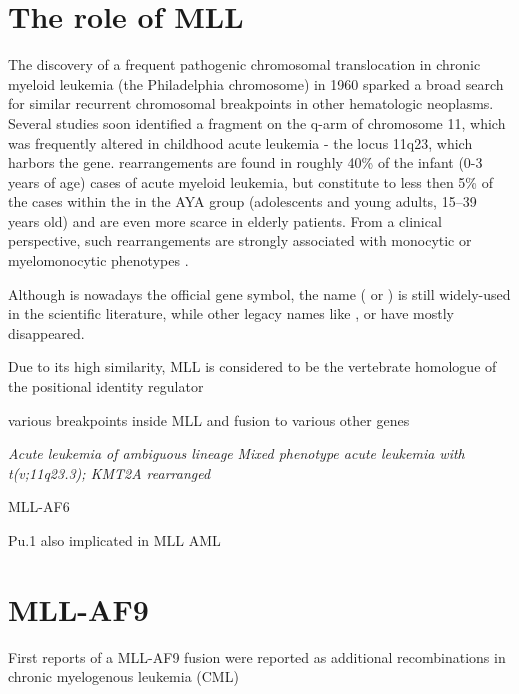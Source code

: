 \section{The role of MLL}

The discovery of a frequent pathogenic chromosomal translocation in chronic myeloid leukemia (the Philadelphia chromosome\cite{Chandra2011}) in 1960 sparked a broad search for similar recurrent chromosomal breakpoints in other hematologic neoplasms. Several studies soon identified a fragment on the q-arm of chromosome 11, which was frequently altered in childhood acute leukemia - the locus 11q23, which harbors the  gene\cite{Ziemin-vanderPoel1991,Thirman1993,Balgobind2009}.  rearrangements are found in roughly 40\% of the infant (0-3 years of age) cases of acute myeloid leukemia, but constitute to less then 5\% of the cases within the in the AYA group (adolescents and young adults, 15–39 years old) and are even more scarce in elderly patients\cite{Bolouri2017}. From a clinical perspective, such  rearrangements are strongly associated with monocytic or myelomonocytic phenotypes \cite{Sorensen1994}. 

Although  is nowadays the official gene symbol, the name  ( or ) is still widely-used in the scientific literature, while other legacy names like ,  or  have mostly disappeared.

Due to its high similarity, MLL is considered to be the vertebrate homologue of the  positional identity regulator \cite{Gu1992,Tkachuk1992,Djabali1992}

various breakpoints inside MLL\cite{Kobayashi1993} and fusion to various other genes \cite{VanderBurg1999} 


{\emph{Acute leukemia of ambiguous lineage}
\emph{Mixed phenotype acute leukemia with t(v;11q23.3); KMT2A rearranged}\cite{Arber2016}}

MLL-AF6\cite{Numata2018}


Pu.1 also implicated in MLL AML\cite{Aikawa2015}

\section{MLL-AF9}
First reports of a MLL-AF9 fusion were reported as additional recombinations in chronic myelogenous leukemia (CML) \cite{Rowley1973}

